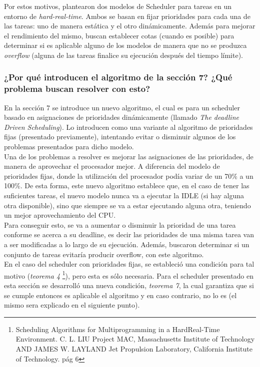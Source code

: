 \documentclass[a4paper]{article}
\begin{document}
Por estos motivos, plantearon dos modelos de Scheduler para tareas en un entorno de \textit{hard-real-time}. Ambos se basan en fijar prioridades para cada una de las tareas: uno de manera estática y el otro dinámicamente. Además para mejorar el rendimiento del mismo, buscan establecer cotas (cuando es posible) para determinar si es aplicable alguno de los modelos de manera que no se produzca \textit{overflow} (alguna de las tareas finalice su ejecución después del tiempo límite).


\subsubsection{¿Por qu\'e introducen el algoritmo de la secci\'on 7? ¿Qu\'e problema buscan resolver con esto?}
En la sección 7 se introduce un nuevo algoritmo, el cual es para un scheduler basado en asignaciones de prioridades dinámicamente (llamado \textit{The deadline Driven Scheduling}). Lo introducen como una variante al algoritmo de prioridades fijas (presentado previamente), intentando evitar o disminuir algunos de los problemas presentados para dicho modelo. \\

Una de los problemas a resolver es mejorar las asignaciones de las prioridades, de manera de aprovechar el procesador mejor. A diferencia del modelo de prioridades fijas, donde la utilización del procesador podía variar de un 70\% a un 100\%. De esta forma, este nuevo algoritmo establece que, en el caso de tener las suficientes tareas, el nuevo modelo nunca va a ejecutar la IDLE (si hay alguna otra disponible), sino que siempre se va a estar ejecutando alguna otra, teniendo un mejor aprovechamiento del CPU. \\

 Para conseguir esto, se va a aumentar o disminuir la prioridad de una tarea conforme se acerca a su deadline, es decir las prioridades de una misma tarea van a ser modificadas a lo largo de su ejecución. Además, buscaron determinar si un conjunto de tareas evitar\'ia producir overflow, con este algoritmo.\\
 
  En el caso del scheduler con prioridades fijas, se estableció una condición para tal motivo (\textit{teorema 4} \footnote{Scheduling Algorithms for Multiprogramming in a HardReal-Time Environment.
C. L. LIU Project MAC, Massachusetts Institute of Technology AND JAMES W. LAYLAND Jet Propulsion Laboratory, California Institute of Technology. pág 6}), pero esta es s\'olo necesaria. Para el scheduler presentado en esta sección se desarroll\'o una nueva condición, \textit{teorema 7}, la cual garantiza que si se cumple entonces es aplicable el algoritmo y en caso contrario, no lo es (el mismo sera explicado en el siguiente punto). \\
  
\end{document}
